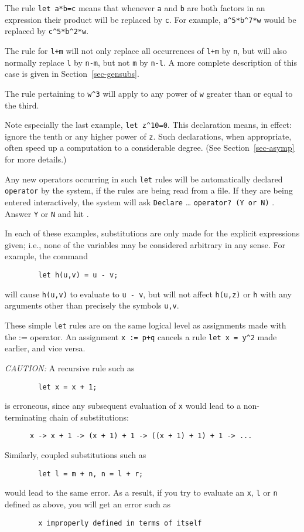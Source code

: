 The rule \texttt{let a*b=c} means that whenever \texttt{a} and \texttt{b} are both
factors in an expression their product will be replaced by \texttt{c}.  For
example, \texttt{a\textasciicircum5*b\textasciicircum7*w} would be replaced by
\texttt{c\textasciicircum5*b\textasciicircum2*w}.

The rule for \texttt{l+m} will not only replace all occurrences of \texttt{l+m}
by \texttt{n}, but will also normally replace \texttt{l} by \texttt{n-m}, but not
\texttt{m} by \texttt{n-l}.  A more complete description of this case is given
in Section~\ref{sec-gensubs}.

The rule pertaining to \texttt{w\textasciicircum3} will apply to any power of \texttt{w}
greater than or equal to the third.

Note especially the last example, \texttt{let z\textasciicircum10=0}.  This declaration
means, in effect: ignore the tenth or any higher power of \texttt{z}.  Such
declarations, when appropriate, often speed up a computation to a
considerable degree. (See
Section~\ref{sec-asymp} for more details.)

Any new operators occurring in such \texttt{let} rules will be automatically
declared \texttt{operator} by the system, if the rules are being read from a
file.  If they are being entered interactively, the system will ask
\texttt{Declare} \ldots{} \texttt{operator? (Y or N)} .  Answer \texttt{Y} or \texttt{N} and hit
.

In each of these examples, substitutions are only made for the explicit
expressions given; i.e., none of the variables may be considered arbitrary
in any sense. For example, the command
\begin{verbatim}
        let h(u,v) = u - v;
\end{verbatim}
will cause \texttt{h(u,v)} to evaluate to \texttt{u - v}, but will not affect
\texttt{h(u,z)} or \texttt{h} with any arguments other than precisely the
symbols \texttt{u,v}.

These simple \texttt{let} rules are on the same logical level as assignments
made with the := operator.  An assignment \texttt{x := p+q} cancels a rule
\texttt{let x = y\textasciicircum2} made earlier, and vice versa.

\textit{CAUTION:} A recursive rule such as
\begin{verbatim}
        let x = x + 1;
\end{verbatim}
is erroneous, since any subsequent evaluation of \texttt{x} would lead to a
non-terminating chain of substitutions:
\begin{verbatim}
      x -> x + 1 -> (x + 1) + 1 -> ((x + 1) + 1) + 1 -> ...
\end{verbatim}
Similarly, coupled substitutions such as
\begin{verbatim}
        let l = m + n, n = l + r;
\end{verbatim}
would lead to the same error. As a result, if you try to evaluate an \texttt{x},
\texttt{l} or \texttt{n} defined as above, you will get an error such as
\begin{verbatim}
        x improperly defined in terms of itself
\end{verbatim}

